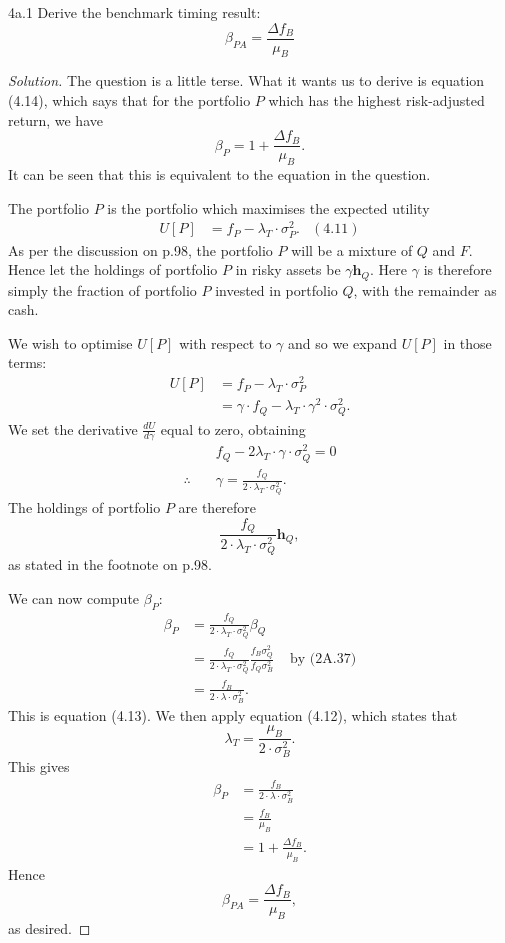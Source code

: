 
\begin{problem}{4a.1}
Derive the benchmark timing result: \[\beta_{PA} = \frac{\Delta f_{B}}{\mu_{B}}\]
\end{problem}

\begin{proof}[Solution]
The question is a little terse. What it wants us to derive is equation (4.14), which says that for the portfolio $P$ which has the highest risk-adjusted return, we have \[\beta_{P} = 1 + \frac{\Delta f_{B}}{\mu_{B}}.\] It can be seen that this is equivalent to the equation in the question.

The portfolio $P$ is the portfolio which maximises the expected utility
\begin{align*}
U[P] &= f_{P} - \lambda_{T} \cdot \sigma_{P}^{2}. & (4.11)
\end{align*}
As per the discussion on p.98, the portfolio $P$ will be a mixture of $Q$ and $F$. Hence let the holdings of portfolio $P$ in risky assets be $\gamma \mathbf{h}_{Q}$. Here $\gamma$ is therefore simply the fraction of portfolio $P$ invested in portfolio $Q$, with the remainder as cash.

We wish to optimise $U[P]$ with respect to $\gamma$ and so we expand $U[P]$ in those terms:
\begin{align*}
U[P] &= f_{P} - \lambda_{T} \cdot \sigma_{P}^{2}\\
&= \gamma \cdot f_{Q} - \lambda_{T} \cdot \gamma^{2} \cdot \sigma_{Q}^{2}.
\end{align*}
We set the derivative $\frac{dU}{d\gamma}$ equal to zero, obtaining
\begin{align*}
&f_{Q} - 2 \lambda_{T} \cdot \gamma \cdot \sigma_{Q}^{2} = 0 \\
\therefore \quad &\gamma = \frac{f_{Q}}{2 \cdot \lambda_{T} \cdot \sigma_{Q}^{2}}. 
\end{align*}
The holdings of portfolio $P$ are therefore \[\frac{f_{Q}}{2 \cdot \lambda_{T} \cdot \sigma_{Q}^{2}}\mathbf{h}_{Q},\] as stated in the footnote on p.98.

We can now compute $\beta_{P}$:
\begin{align*}
\beta_{P} &= \frac{f_{Q}}{2 \cdot \lambda_{T} \cdot \sigma_{Q}^{2}}\beta_{Q}\\
&= \frac{f_{Q}}{2 \cdot \lambda_{T} \cdot \sigma_{Q}^{2}} \frac{f_{B}\sigma_{Q}^{2}}{f_{Q}\sigma_{B}^{2}} & \text{ by (2A.37)}\\
&= \frac{f_{B}}{2 \cdot \lambda \cdot \sigma_{B}^{2}}.
\end{align*}
This is equation (4.13). We then apply equation (4.12), which states that \[\lambda_{T} = \frac{\mu_{B}}{2 \cdot \sigma_{B}^{2}}.\] This gives
\begin{align*}
\beta_{P} &= \frac{f_{B}}{2 \cdot \lambda \cdot \sigma_{B}^{2}}\\
&= \frac{f_{B}}{\mu_{B}}\\
&= 1 + \frac{\Delta f_{B}}{\mu_{B}}.
\end{align*}
Hence \[\beta_{PA} = \frac{\Delta f_{B}}{\mu_{B}},\] as desired.
\end{proof}
